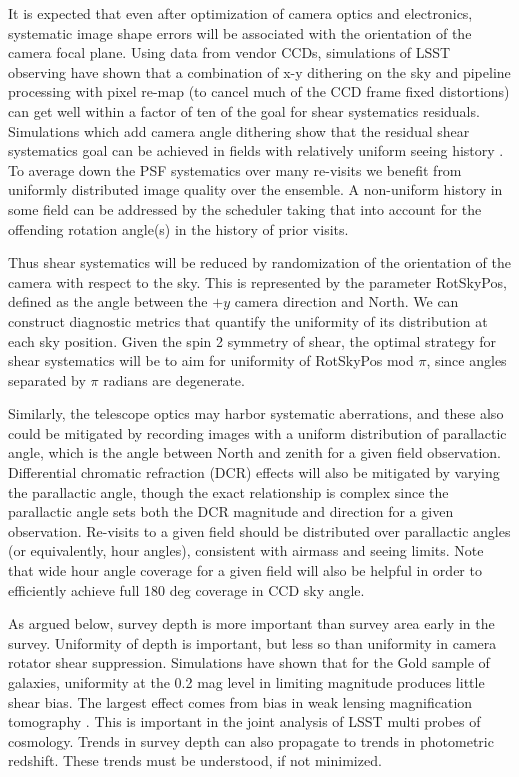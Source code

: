 It is expected that even after optimization of camera optics and electronics,
systematic image shape errors will be associated with the orientation of the
camera focal plane.  Using data from vendor CCDs, simulations of LSST observing
have shown that a combination of x-y dithering on the sky and pipeline
processing with pixel re-map (to cancel much of the CCD frame fixed distortions)
can get well within a factor of ten of the goal for shear systematics residuals.
Simulations which add camera angle dithering show that the residual shear
systematics goal can be achieved in fields with relatively uniform seeing
history \citep{Jee&Tyson2011}.  To average down the PSF systematics over many
re-visits we benefit from uniformly distributed image quality over the ensemble.
A non-uniform history in some field can be addressed by the scheduler taking
that into account for the offending rotation angle(s) in the history of prior
visits.

Thus shear systematics will be reduced by randomization of the orientation of
the camera with respect to the sky.  This is represented by the parameter
RotSkyPos, defined as the angle between the $+y$ camera direction and North.  We
can construct diagnostic metrics that quantify the uniformity of its
distribution at each sky position.  Given the spin 2 symmetry of shear, the
optimal strategy for shear systematics will be to aim for uniformity of
RotSkyPos mod $\pi$, since angles separated by $\pi$ radians are degenerate.

Similarly, the telescope optics may harbor systematic aberrations, and these
also could be mitigated by recording images with a uniform distribution of
parallactic angle, which is the angle between North and zenith for a given field
observation.  Differential chromatic refraction (DCR) effects will also be
mitigated by varying the parallactic angle, though the exact relationship is
complex since the parallactic angle sets both the DCR magnitude and direction
for a given observation.  Re-visits to a given field should be distributed over
parallactic angles (or equivalently, hour angles), consistent with airmass and
seeing limits.  Note that wide hour angle coverage for a given field will also
be helpful in order to efficiently achieve full 180 deg coverage in CCD sky
angle.

As argued below, survey depth is more important than survey area early in the
survey.  Uniformity of depth is important, but less so than uniformity in camera
rotator shear suppression.  Simulations have shown that for the Gold sample of
galaxies, uniformity at the 0.2 mag level in limiting magnitude produces little
shear bias.  The largest effect comes from bias in weak lensing magnification
tomography \citet{Morrison2012}.  This is important in the joint analysis of
LSST multi probes of cosmology.  Trends in survey depth can also propagate to
trends in photometric redshift.  These trends must be understood, if not
minimized.


